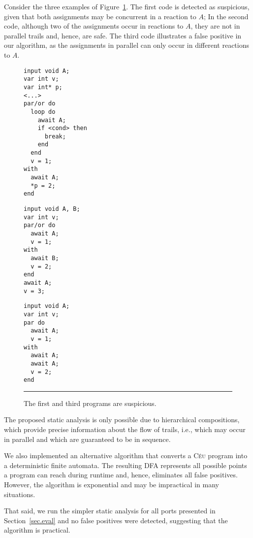\documentclass[10pt]{sensys-proc}
\newcommand{\CEU}{\textsc{C\'{e}u}\xspace}
\begin{document}
Consider the three examples of Figure~\ref{lst.det}.
The first code is detected as suspicious, given that both assignments may be 
concurrent in a reaction to $A$;
In the second code, although two of the assignments occur in reactions to $A$, 
they are not in parallel trails and, hence, are safe.
The third code illustrates a false positive in our algorithm, as the 
assignments in parallel can only occur in different reactions to $A$.

\begin{figure}[t]
\begin{minipage}[t]{0.36\linewidth}
{\small
\begin{verbatim}
input void A;
var int v;
var int* p;
<...>
par/or do
  loop do
    await A;
    if <cond> then
      break;
    end
  end
  v = 1;
with
  await A;
  *p = 2;
end
\end{verbatim}
}
\end{minipage}
\hspace{0cm}
\begin{minipage}[t]{0.32\linewidth}
{\small
\begin{verbatim}
input void A, B;
var int v;
par/or do
  await A;
  v = 1;
with
  await B;
  v = 2;
end
await A;
v = 3;
\end{verbatim}
}
\end{minipage}
\hspace{0cm}
\begin{minipage}[t]{0.28\linewidth}
{\small
\begin{verbatim}
input void A;
var int v;
par do
  await A;
  v = 1;
with
  await A;
  await A;
  v = 2;
end
\end{verbatim}
}
\end{minipage}
\rule{8.5cm}{0.37pt}
\caption{ The first and third programs are suspicious.
\label{lst.det}
}
\end{figure}

The proposed static analysis is only possible due to hierarchical compositions, 
which provide precise information about the flow of trails, i.e., which may 
occur in parallel and which are guaranteed to be in sequence.

We also implemented an alternative algorithm that converts a \CEU program into 
a deterministic finite automata.
The resulting DFA represents all possible points a program can reach during 
runtime and, hence, eliminates all false positives.
However, the algorithm is exponential and may be impractical in many 
situations.

That said, we run the simpler static analysis for all ports presented in 
Section~\ref{sec.eval} and no false positives were detected, suggesting that 
the algorithm is practical.
\end{document}

